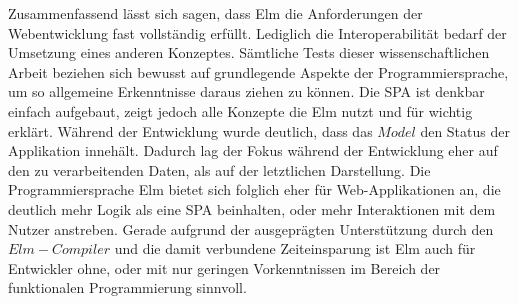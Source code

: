 Zusammenfassend lässt sich sagen, dass Elm die Anforderungen der Webentwicklung fast vollständig erfüllt. Lediglich die Interoperabilität bedarf der Umsetzung eines anderen Konzeptes.
Sämtliche Tests dieser wissenschaftlichen Arbeit beziehen sich bewusst auf grundlegende Aspekte der Programmiersprache, um so allgemeine Erkenntnisse daraus ziehen zu können. Die \ac{SPA} ist denkbar einfach aufgebaut, zeigt jedoch alle Konzepte die Elm nutzt und für wichtig erklärt. Während der Entwicklung wurde deutlich, dass das $Model$ den Status der Applikation innehält. Dadurch lag der Fokus während der Entwicklung eher auf den zu verarbeitenden Daten, als auf der letztlichen Darstellung. Die Programmiersprache Elm bietet sich folglich eher für Web-Applikationen an, die deutlich mehr Logik als eine \ac{SPA} beinhalten, oder mehr Interaktionen mit dem Nutzer anstreben. Gerade aufgrund der ausgeprägten Unterstützung durch den $Elm-Compiler$ und die damit verbundene Zeiteinsparung ist Elm auch für Entwickler ohne, oder mit nur geringen Vorkenntnissen im Bereich der funktionalen Programmierung sinnvoll.
